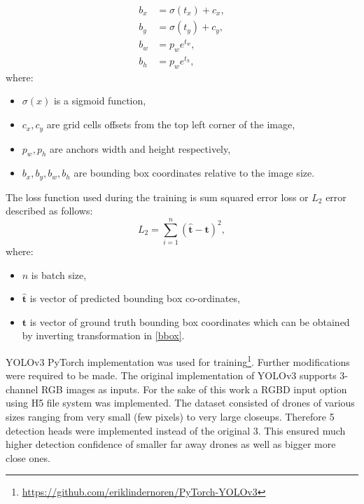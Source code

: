 \documentclass[twoside]{ctuthesis}
\theoremstyle{plain}
\theoremstyle{definition}
\theoremstyle{note}
\begin{document}
\begin{equation}\label{bbox}
	\begin{aligned}
		b_x&=\sigma(t_x)+c_x,\\
		b_y&=\sigma(t_y)+c_y,\\
		b_w&=p_{w}e^{t_w},\\
		b_h&=p_{w}e^{t_h},
	\end{aligned}
\end{equation}
where:
\begin{itemize}
	\item $\sigma(x)$ is a sigmoid function,
	\item $c_x, c_y$ are grid cells offsets from the top left corner of the image,
	\item $p_w, p_h$ are anchors width and height respectively,
	\item $b_x, b_y, b_w, b_h$ are bounding box coordinates relative to the image size.
\end{itemize}
The loss function used during the training is sum squared error loss or $L_2$ error described as follows:
\begin{equation}
	L_2=\sum_{i=1}^{n}(\mathbf{\hat{t}}-\mathbf{t})^2,
\end{equation}
where:
\begin{itemize}
	\item $n$ is batch size,
	\item $\mathbf{\hat{t}}$ is vector of predicted bounding box co-ordinates,
	\item $\mathbf{t}$ is vector of ground truth bounding box coordinates which can be obtained by inverting transformation in \ref{bbox}.
\end{itemize}
YOLOv3 PyTorch implementation was used for training\footnote{\url{https://github.com/eriklindernoren/PyTorch-YOLOv3}}. Further modifications were required to be made. The original implementation of YOLOv3 supports 3-channel RGB images as inputs. For the sake of this work a RGBD input option using H5 file system was implemented. The dataset consisted of drones of various sizes ranging from very small (few pixels) to very large closeups. Therefore 5 detection heads were implemented instead of the original 3. This ensured much higher detection confidence of smaller far away drones as well as bigger more close ones.
\end{document}
